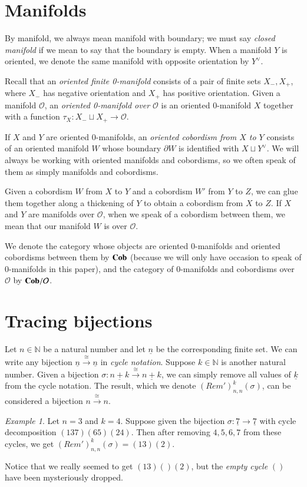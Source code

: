 \documentclass{amsart}
\def\mc{\mathcal}
\def\NN{{\mathbb N}}
\def\to{\rightarrow}
\def\taking{\colon}
\def\iso{\cong}
\def\ul{\underline}
\newcommand{\To}[1]{\xrightarrow{#1}}
\def\Cob{{\bf Cob}}
\def\mcO{\mc{O}}
\newcommand{\inp}[1]{{#1_-}}
\newcommand{\outp}[1]{{#1_+}}
\theoremstyle{remark}
\newtheorem{example}[subsubsection]{Example}
\theoremstyle{definition}
\begin{document}
\section{Manifolds}

By manifold, we always mean manifold with boundary; we must say {\em closed manifold} if we mean to say that the boundary is empty. When a manifold $Y$ is oriented, we denote the same manifold with opposite orientation by $Y^\vee$.

Recall that an {\em oriented finite 0-manifold} consists of a pair of finite sets $\inp{X},\outp{X}$, where $\inp{X}$ has negative orientation and $\outp{X}$ has positive orientation. Given a manifold $\mcO$, an {\em oriented 0-manifold over $\mcO$} is an oriented $0$-manifold $X$ together with a function $\tau_X\taking\inp{X}\sqcup \outp{X}\to\mcO$. 

If $X$ and $Y$ are oriented $0$-manifolds, an {\em oriented cobordism from $X$ to $Y$} consists of an oriented manifold $W$ whose boundary $\partial W$ is identified with $X\sqcup Y^\vee$. We will always be working with oriented manifolds and cobordisms, so we often speak of them as simply manifolds and cobordisms. 

Given a cobordism $W$ from $X$ to $Y$ and a cobordism $W'$ from $Y$ to $Z$, we can glue them together along a thickening of $Y$ to obtain a cobordism from $X$ to $Z$. If $X$ and $Y$ are manifolds over $\mcO$, when we speak of a cobordism between them, we mean that our manifold $W$ is over $\mcO$.

We denote the category whose objects are oriented $0$-manifolds and oriented cobordisms between them by $\Cob$ (because we will only have occasion to speak of $0$-manifolds in this paper), and the category of 0-manifolds and cobordisms over $\mcO$ by $\Cob/\mcO$.

\section{Tracing bijections}

Let $n\in\NN$ be a natural number and let $\ul{n}$ be the corresponding finite set. We can write any bijection $\ul{n}\To{\iso}\ul{n}$ in {\em cycle notation}. Suppose $k\in\NN$ is another natural number. Given a bijection $\sigma\taking\ul{n+k}\To{\iso}\ul{n+k}$, we can simply remove all values of $\ul{k}$ from the cycle notation. The result, which we denote $(Rem')^k_{n,n}(\sigma)$, can be considered a bijection $n\To{\iso}n$.

\begin{example}

Let $n=3$ and $k=4$. Suppose given the bijection $\sigma\taking\ul{7}\to\ul{7}$ with cycle decomposition $(1 3 7)(6 5)(2 4)$. Then after removing $4,5,6,7$ from these cycles, we get $(Rem')^k_{n,n}(\sigma)=(1 3)(2)$. 

Notice that we really seemed to get $(1 3)()(2)$, but the {\em empty cycle} $()$ have been mysteriously dropped.

\end{example}
\end{document}
